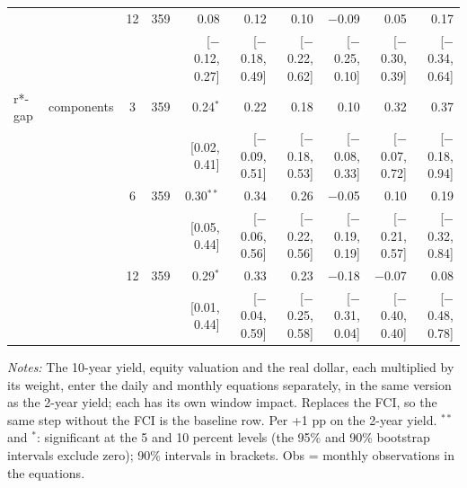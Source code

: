 \begin{longtable}{llcrrrrrrr}
 &  & 12 & 359 & 0.08 & 0.12 & 0.10 & $-$0.09 & 0.05 & 0.17\\
 & & & & {\scriptsize [$-$0.12, 0.27]} & {\scriptsize [$-$0.18, 0.49]} & {\scriptsize [$-$0.22, 0.62]} & {\scriptsize [$-$0.25, 0.10]} & {\scriptsize [$-$0.30, 0.39]} & {\scriptsize [$-$0.34, 0.64]}\\
\addlinespace
r*-gap & components & 3 & 359 & 0.24$^{*}$ & 0.22 & 0.18 & 0.10 & 0.32 & 0.37\\
 & & & & {\scriptsize [0.02, 0.41]} & {\scriptsize [$-$0.09, 0.51]} & {\scriptsize [$-$0.18, 0.53]} & {\scriptsize [$-$0.08, 0.33]} & {\scriptsize [$-$0.07, 0.72]} & {\scriptsize [$-$0.18, 0.94]}\\
 &  & 6 & 359 & 0.30$^{**}$ & 0.34 & 0.26 & $-$0.05 & 0.10 & 0.19\\
 & & & & {\scriptsize [0.05, 0.44]} & {\scriptsize [$-$0.06, 0.56]} & {\scriptsize [$-$0.22, 0.56]} & {\scriptsize [$-$0.19, 0.19]} & {\scriptsize [$-$0.21, 0.57]} & {\scriptsize [$-$0.32, 0.84]}\\
 &  & 12 & 359 & 0.29$^{*}$ & 0.33 & 0.23 & $-$0.18 & $-$0.07 & 0.08\\
 & & & & {\scriptsize [0.01, 0.44]} & {\scriptsize [$-$0.04, 0.59]} & {\scriptsize [$-$0.25, 0.58]} & {\scriptsize [$-$0.31, 0.04]} & {\scriptsize [$-$0.40, 0.40]} & {\scriptsize [$-$0.48, 0.78]}\\
\end{longtable}
\begin{flushleft}\footnotesize\textit{Notes:} The 10-year yield, equity valuation and the real dollar, each multiplied by its weight, enter the daily and monthly equations separately, in the same version as the 2-year yield; each has its own window impact. Replaces the FCI, so the same step without the FCI is the baseline row. Per +1 pp on the 2-year yield. $^{**}$ and $^{*}$: significant at the 5 and 10 percent levels (the 95\% and 90\% bootstrap intervals exclude zero); 90\% intervals in brackets. Obs = monthly observations in the equations.\end{flushleft}
\endgroup
